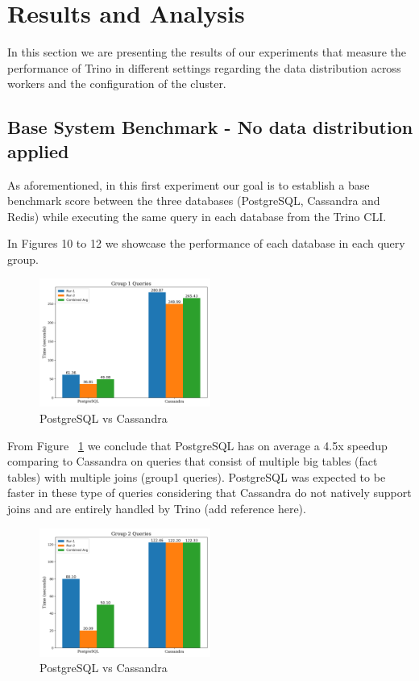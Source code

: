 \documentclass[conference]{IEEEtran}
\begin{document}
\section{Results and Analysis}

In this section we are presenting the results of our experiments that measure the performance of Trino in different settings regarding the data distribution across workers and the configuration of the cluster.

\subsection{Base System Benchmark - No data distribution applied}
\label{sec:no-data-distribution}

As aforementioned, in this first experiment our goal is to establish a base benchmark score between the three databases (PostgreSQL, Cassandra and Redis) while executing the same query in each database from the Trino CLI.

In Figures 10 to 12 we showcase the performance of each database in each query group.

\begin{figure}[h]
	\centering
	\includegraphics[width=0.5\textwidth]{images/DBs_bench_no_distro/group1.png}
	\caption{PostgreSQL vs Cassandra}
	\label{fig:psql-cass-group1}
\end{figure}

From Figure ~\ref{fig:psql-cass-group1} we conclude that PostgreSQL has on average a 4.5x speedup comparing to Cassandra on queries that consist of multiple big tables (fact tables) with multiple joins (group1 queries). PostgreSQL was expected to be faster in these type of queries considering that Cassandra do not natively support joins and are entirely handled by Trino (add reference here).

\begin{figure}[h]
	\centering
	\includegraphics[width=0.5\textwidth]{images/DBs_bench_no_distro/group2.png}
	\caption{PostgreSQL vs Cassandra}
	\label{fig:psql-cass-group2}
\end{figure}
\end{document}
